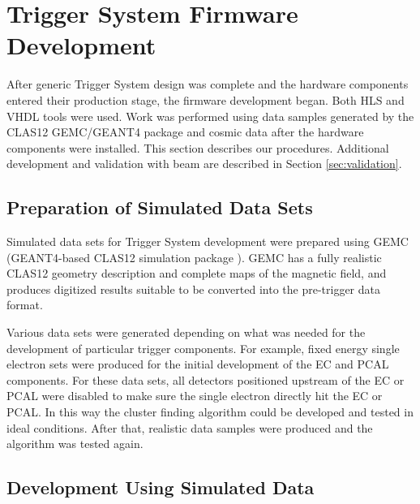 \section{Trigger System Firmware Development}

After generic Trigger System design was complete and the hardware components entered their production stage, the firmware development began. Both HLS and VHDL tools were used. Work was performed using data samples generated by the CLAS12 GEMC/GEANT4 package and cosmic data after the hardware components were installed. This section describes our procedures. Additional development and validation with beam are described in Section \ref{sec:validation}.

\subsection{Preparation of Simulated Data Sets}
\label{simulated_data_preparation}

Simulated data sets for Trigger System development were prepared using GEMC (GEANT4-based CLAS12 simulation package \cite{gemc-ref}). GEMC has a fully realistic CLAS12 geometry description and complete maps of the magnetic field, and produces digitized results suitable to be converted into the pre-trigger data format.

Various data sets were generated depending on what was needed for the development of particular trigger components. For example, fixed energy single electron sets were produced for the initial development of the EC and PCAL components. For these data sets, all detectors positioned upstream of the EC or PCAL were disabled to make sure the single electron directly hit the EC or PCAL. In this way the cluster finding algorithm could be developed and tested in ideal conditions. After that, realistic data samples were produced and the algorithm was tested again.



\subsection{Development Using Simulated Data}

